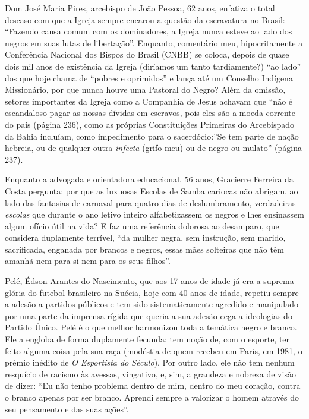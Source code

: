 \documentclass[
  letterpaper,
  DIV=11,
  numbers=noendperiod]{scrreprt}
\begin{document}
Dom José Maria Pires, arcebispo de João Pessoa, 62 anos, enfatiza o
total descaso com que a Igreja sempre encarou a questão da escravatura
no Brasil: ``Fazendo causa comum com os dominadores, a Igreja nunca
esteve ao lado dos negros em suas lutas de libertação''. Enquanto,
comentário meu, hipocritamente a Conferência Nacional dos Bispos do
Brasil (CNBB) se coloca, depois de quase dois mil anos de existência da
Igreja (diríamos um tanto tardiamente?) ``ao lado'' dos que hoje chama
de ``pobres e oprimidos'' e lança até um Conselho Indígena Missionário,
por que nunca houve uma Pastoral do Negro? Além da omissão, setores
importantes da Igreja como a Companhia de Jesus achavam que ``não é
escandaloso pagar as nossas dívidas em escravos, pois eles são a moeda
corrente do país (página 236), como as próprias Constituições Primeiras
do Arcebispado da Bahia incluíam, como impedimento para o
sacerdócio:''Se tem parte de nação hebreia, ou de qualquer outra
\emph{infecta} (grifo meu) ou de negro ou mulato'' (página 237).

Enquanto a advogada e orientadora educacional, 56 anos, Gracierre
Ferreira da Costa pergunta: por que as luxuosas Escolas de Samba
cariocas não abrigam, ao lado das fantasias de carnaval para quatro dias
de deslumbramento, verdadeiras \emph{escolas} que durante o ano letivo
inteiro alfabetizassem os negros e lhes ensinassem algum ofício útil na
vida? E faz uma referência dolorosa ao desamparo, que considera
duplamente terrível, ``da mulher negra, sem instrução, sem marido,
sacrificada, enganada por brancos e negros, essas mães solteiras que não
têm amanhã nem para si nem para os seus filhos''.

Pelé, Édson Arantes do Nascimento, que aos 17 anos de idade já era a
suprema glória do futebol brasileiro na Suécia, hoje com 40 anos de
idade, repetiu sempre a adesão a partidos públicos e tem sido
sistematicamente agredido e manipulado por uma parte da imprensa rígida
que queria a sua adesão cega a ideologias do Partido Único. Pelé é o que
melhor harmonizou toda a temática negro e branco. Ele a engloba de forma
duplamente fecunda: tem noção de, com o esporte, ter feito alguma coisa
pela sua raça (modéstia de quem recebeu em Paris, em 1981, o prêmio
inédito de \emph{O Esportista do Século}). Por outro lado, ele não tem
nenhum resquício de racismo às avessas, vingativo, e, sim, a grandeza e
nobreza de visão de dizer: ``Eu não tenho problema dentro de mim, dentro
do meu coração, contra o branco apenas por ser branco. Aprendi sempre a
valorizar o homem através do seu pensamento e das suas ações''.
\end{document}
